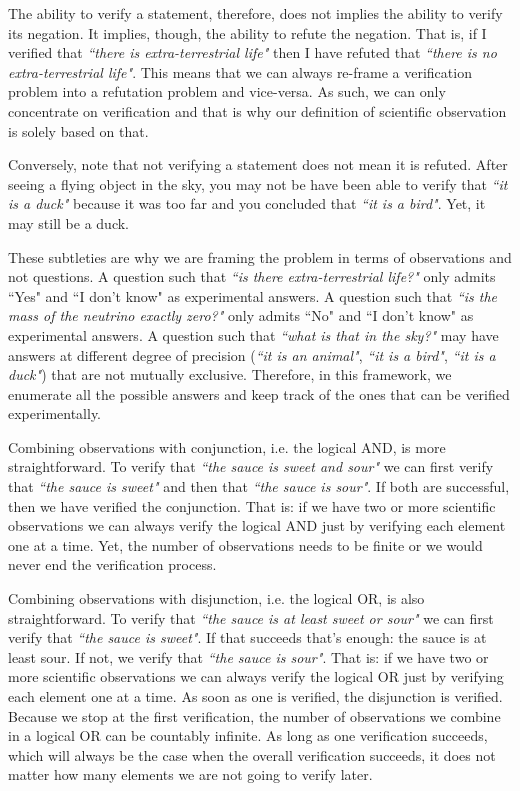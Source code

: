 \documentclass[11pt,letterpaper,fleqn]{memoir} %
\begin{document}
The ability to verify a statement, therefore, does not implies the ability to verify its negation. It implies, though, the ability to refute the negation. That is, if I verified that \emph{``there is extra-terrestrial life"} then I have refuted that \emph{``there is no extra-terrestrial life"}. This means that we can always re-frame a verification problem into a refutation problem and vice-versa. As such, we can only concentrate on verification and that is why our definition of scientific observation is solely based on that.

Conversely, note that not verifying a statement does not mean it is refuted. After seeing a flying object in the sky, you may not be have been able to verify that \emph{``it is a duck"} because it was too far and you concluded that \emph{``it is a bird"}. Yet, it may still be a duck.

These subtleties are why we are framing the problem in terms of observations and not questions. A question such that \emph{``is there extra-terrestrial life?"} only admits ``Yes" and ``I don't know" as experimental answers. A question such that \emph{``is the mass of the neutrino exactly zero?"} only admits ``No" and ``I don't know" as experimental answers. A question such that \emph{``what is that in the sky?"} may have answers at different degree of precision (\emph{``it is an animal"}, \emph{``it is a bird"}, \emph{``it is a duck"}) that are not mutually exclusive. Therefore, in this framework, we enumerate all the possible answers and keep track of the ones that can be verified experimentally.

Combining observations with conjunction, i.e. the logical AND, is more straightforward. To verify that \emph{``the sauce is sweet and sour"} we can first verify that \emph{``the sauce is sweet"} and then that \emph{``the sauce is sour"}. If both are successful, then we have verified the conjunction. That is: if we have two or more scientific observations we can always verify the logical AND just by verifying each element one at a time. Yet, the number of observations needs to be finite or we would never end the verification process.

Combining observations with disjunction, i.e. the logical OR, is also straightforward. To verify that \emph{``the sauce is at least sweet or sour"} we can first verify that \emph{``the sauce is sweet"}. If that succeeds that's enough: the sauce is at least sour. If not, we verify that \emph{``the sauce is sour"}. That is: if we have two or more scientific observations we can always verify the logical OR just by verifying each element one at a time. As soon as one is verified, the disjunction is verified. Because we stop at the first verification, the number of observations we combine in a logical OR can be countably infinite. As long as one verification succeeds, which will always be the case when the overall verification succeeds, it does not matter how many elements we are not going to verify later.
\end{document}
